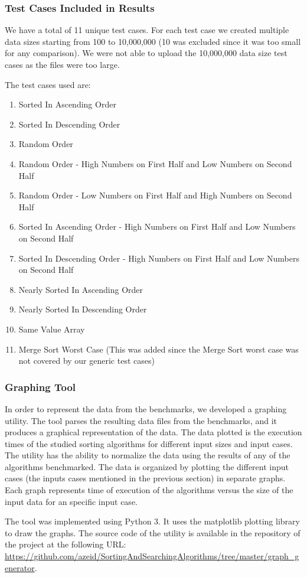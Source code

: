 \subsubsection{Test Cases Included in Results}
We have a total of 11 unique test cases. For each test case we created multiple data sizes starting from 100 to 10,000,000 (10 was excluded since it was too small for any comparison). We were not able to upload the 10,000,000 data size test cases as the files were too large.

The test cases used are:
\begin{enumerate}
    \item Sorted In Ascending Order
    \item Sorted In Descending Order  
    \item Random Order  
    \item Random Order - High Numbers on First Half and Low Numbers on Second Half  
    \item Random Order - Low Numbers on First Half and High Numbers on Second Half  
    \item Sorted In Ascending Order - High Numbers on First Half and Low Numbers on Second Half 
    \item Sorted In Descending Order - High Numbers on First Half and Low Numbers on Second Half 
    \item Nearly Sorted In Ascending Order
    \item Nearly Sorted In Descending Order
    \item Same Value Array
    \item Merge Sort Worst Case (This was added since the Merge Sort worst case was not covered by our generic test cases)
    
\end{enumerate}

\subsubsection{Graphing Tool}

In order to represent the data from the benchmarks, we developed a graphing utility. The tool parses the resulting data files from the benchmarks, and it produces a graphical representation of the data. The data plotted is the execution times of the studied sorting algorithms for different input sizes and input cases. The utility has the ability to normalize the data using the results of any of the algorithms benchmarked. The data is organized by plotting the different input cases (the inputs cases mentioned in the previous section) in separate graphs. Each graph represents time of execution of the algorithms versus the size of the input data for an specific input case.

The tool was implemented using Python 3. It uses the matplotlib plotting library to draw the graphs. The source code of the utility is available in the repository of the project at the following URL: \url{https://github.com/azeid/SortingAndSearchingAlgorithms/tree/master/graph_generator}.


